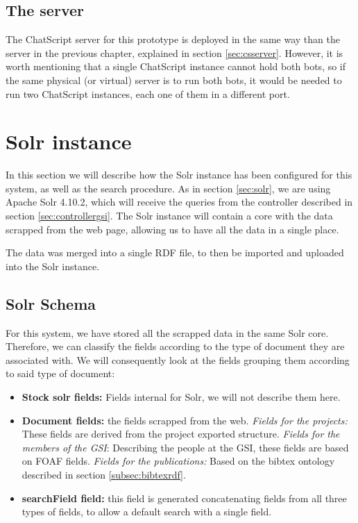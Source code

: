 \subsection{The server}

The ChatScript server for this prototype is deployed in the same way than the server in the previous chapter, explained in section \ref{sec:csserver}. However, it is worth mentioning that a single ChatScript instance cannot hold both bots, so if the same physical (or virtual) server is to run both bots, it would be needed to run two ChatScript instances, each one of them in a different port.

\section{Solr instance}

In this section we will describe how the Solr instance has been configured for this system, as well as the search procedure. As in section \ref{sec:solr}, we are using Apache Solr 4.10.2, which will receive the queries from the controller described in section \ref{sec:controllergsi}. The Solr instance will contain a core with the data scrapped from the web page, allowing us to have all the data in a single place.

The data was merged into a single \ac{RDF} file, to then be imported and uploaded into the Solr instance.

\subsection{Solr Schema}

For this system, we have stored all the scrapped data in the same Solr core. Therefore, we can classify the fields according to the type of document they are associated with. We will consequently look at the fields grouping them according to said type of document:

\begin{itemize}
 \item \textbf{Stock solr fields:} Fields internal for Solr, we will not describe them here.
 \item \textbf{Document fields:} the fields scrapped from the web.
    \subitem \emph{Fields for the projects:} These fields are derived from the project exported structure.
    \subitem \emph{Fields for the members of the GSI}: Describing the people at the GSI, these fields are based on \ac{FOAF} fields.
    \subitem \emph{Fields for the publications:} Based on the bibtex ontology described in section \ref{subsec:bibtexrdf}.
 \item \textbf{searchField field:} this field is generated concatenating fields from all three types of fields, to allow a default search with a single field.
\end{itemize}

